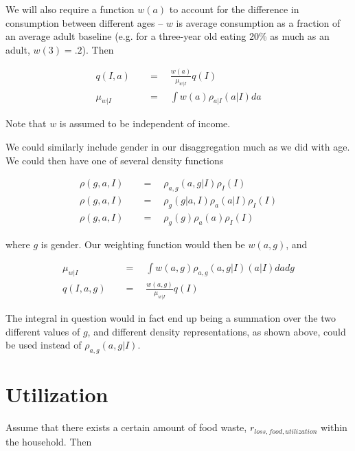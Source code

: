 \documentclass[letter,12pt]{article}
\begin{document}
We will also require a function $w\left(a\right)$ to account for the difference in consumption between different ages -- $w$ is average consumption as a fraction of an average adult baseline (e.g. for a three-year old eating 20\% as much as an adult, $w\left(3\right) = .2$).  Then

\begin{align}
q \left(I,a\right) \quad &= \quad  \frac{w\left(a\right)}{\mu_{w|I}} q\left(I\right) \\
\mu_{w|I} \quad &= \quad  \int w\left(a\right) \rho_{a|I} \left(a|I\right) da
\end{align}

Note that $w$ is assumed to be independent of income.

We could similarly include gender in our disaggregation much as we did with age.  We could then have one of several density functions

\begin{align}
\rho \left(g,a,I\right) \quad &= \quad  \rho_{a,g} \left(a,g|I\right) \rho_I \left(I\right) \\
\rho \left(g,a,I\right) \quad &= \quad  \rho_g \left(g|a,I\right) \rho_a \left(a|I\right) \rho_I \left(I\right) \\
\rho \left(g,a,I\right) \quad &= \quad  \rho_g \left(g\right) \rho_a \left(a\right) \rho_I \left(I\right)
\end{align}

\noindent where $g$ is gender.  Our weighting function would then be $w \left(a,g\right)$, and

\begin{align}
\mu_{w|I} \quad &= \quad  \int w\left(a,g\right) \rho_{a,g} \left(a,g|I\right) \left(a|I\right) da dg \\
q \left(I,a,g\right) \quad &= \quad  \frac{w\left(a,g\right)}{\mu_{w|I}} q\left(I\right)
\end{align}

The integral in question would in fact end up being a summation over the two different values of $g$, and different density representations, as shown above, could be used instead of $\rho_{a,g} \left(a,g|I\right)$.  

\section{Utilization}

Assume that there exists a certain amount of food waste, $r_{loss,food,utilization}$ within the household.  Then
\end{document}
